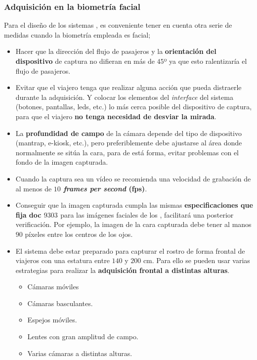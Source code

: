\color{black}


\subsubsection{Adquisición en la biometría facial}\label{subsec:AdquisicionFacialABC}

Para el diseño de los sistemas , es conveniente tener en cuenta otra serie de medidas cuando la biometría empleada es facial;

\begin{itemize}
    \item
    Hacer que la dirección del flujo de pasajeros y la \textbf{orientación del dispositivo} de captura no difieran en más de $45$º ya que esto ralentizaría el flujo de pasajeros.
    
    \item
    Evitar que el viajero tenga que realizar alguna acción que pueda distraerle durante la adquisición. Y colocar los elementos del \textit{interface} del sistema (botones, pantallas, leds, etc.) lo más cerca posible del dispositivo de captura, para que el viajero \textbf{no tenga necesidad de desviar la mirada}.
    
    \item
    La \textbf{profundidad de campo} de la cámara depende del tipo de dispositivo  (\gls{mantrap}, \gls{e-kiosk}, etc.), pero preferiblemente debe ajustarse al área donde normalmente se sitúa la cara, para de está forma, evitar problemas con el fondo de la imagen capturada. 
    
    \item
    Cuando la captura sea un vídeo se recomienda una velocidad de grabación de al menos de \textbf{$10$ \textit{frames per second} (fps)}.
    
    \item
    Conseguir que la imagen capturada cumpla las mismas \textbf{especificaciones que fija  doc $9303$ \cite{doc20069303}} para las imágenes faciales de los , facilitará una posterior verificación. Por ejemplo, la imagen de la cara capturada debe tener al manos $90$ píxeles entre los centros de los ojos.
    
    \item
    El sistema debe estar preparado para capturar el rostro de forma frontal de viajeros con una estatura entre $140$  y $200$ cm. Para ello se pueden usar varias estrategias para realizar la \textbf{adquisición frontal a distintas alturas}.
    \begin{itemize}
    \item 
    Cámaras móviles
    \item
    Cámaras basculantes.
    \item
    Espejos móviles.
    \item
    Lentes con gran amplitud de campo.
    \item
    Varias cámaras a distintas alturas.
    \end{itemize}


\end{itemize}
